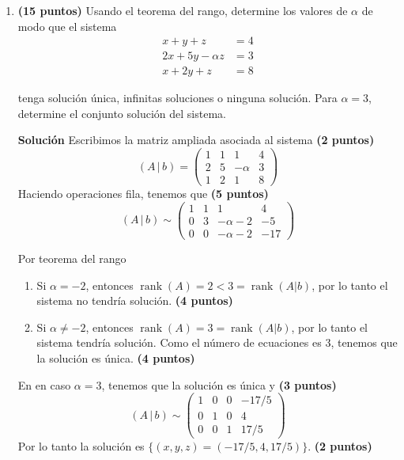 \documentclass[a4paper]{article}
\begin{document}
\begin{enumerate}
    \item {\bf (15 puntos)} Usando el teorema del rango, determine los valores de $\alpha$ de modo que el sistema
    \begin{align*}
x + y +z &= 4 \\
2x + 5y-\alpha z &= 3\\
x + 2y +  z &= 8
\end{align*}

    tenga solución única, infinitas soluciones o ninguna solución. Para $\alpha=3$, determine el conjunto soluci\'on del sistema.
        
        \textbf{Soluci\'on}
Escribimos la matriz ampliada asociada al sistema {\bf (2 puntos)}
\[
(A\,|\,b)=\left( 
    \begin{array}{ccc|c}
    1 & 1  & 1 & 4 \\ 2 & 5 & -\alpha & 3\\ 1 & 2 & 1& 8  \end{array}
\right)\]
Haciendo operaciones fila, tenemos que {\bf (5 puntos)}
\[
(A\,|\,b)\sim \left( 
    \begin{array}{ccc|c} 1 & 1  & 1 & 4 \\ 0 & 3 & -\alpha-2 & -5\\ 0 & 0 & -\alpha -2 & -17  \end{array}
\right)\]

Por teorema del rango
\begin{enumerate}
    \item Si $\alpha=-2$, entonces $\operatorname{rank}(A)=2<3=\operatorname{rank}(A|b)$, por lo tanto el sistema no tendr\'ia soluci\'on. {\bf (4 puntos)}
    \item Si $\alpha\neq -2$, entonces $\operatorname{rank}(A)=3=\operatorname{rank}(A|b)$, por lo tanto el sistema tendr\'ia soluci\'on. Como el n\'umero de ecuaciones es 3, tenemos que la soluci\'on es \'unica. {\bf (4 puntos)}
\end{enumerate}
En en caso $\alpha=3$, tenemos que la soluci\'on es \'unica y {\bf (3 puntos)}
\[
(A\,|\,b)\sim \left( 
    \begin{array}{ccc|c} 1 & 0  & 0 & -17/5 \\ 0 & 1 & 0 & 4\\ 0 & 0 & 1 & 17/5  \end{array}
\right)\]
Por lo tanto la soluci\'on es $\{(x,y,z)=(-17/5,4,17/5)\}$. {\bf (2 puntos)}




\end{enumerate}
\end{document}
